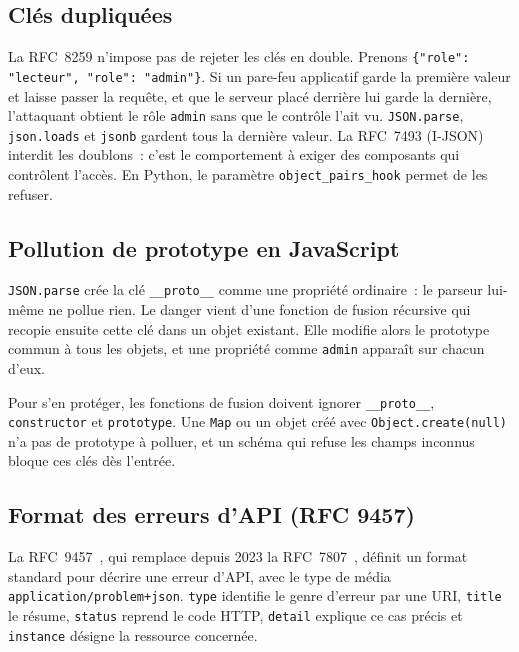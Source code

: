 \documentclass[12pt,a4paper]{article}
\newcommand{\exemple}[3][]{%
  \par\addvspace{6pt}\noindent\begin{minipage}{\linewidth}%
  \end{minipage}\par\addvspace{6pt}}
\begin{document}
\subsection{Clés dupliquées}
\label{sec:doublons}
La RFC~8259 n'impose pas de rejeter les clés en double. Prenons \texttt{\{"role": "lecteur", "role": "admin"\}}. Si un pare-feu applicatif garde la première valeur et laisse passer la requête, et que le serveur placé derrière lui garde la dernière, l'attaquant obtient le rôle \texttt{admin} sans que le contrôle l'ait vu. \texttt{JSON.parse}, \texttt{json.loads} et \texttt{jsonb} gardent tous la dernière valeur. La RFC~7493 (I-JSON)~\cite{bray2015rfc7493} interdit les doublons~: c'est le comportement à exiger des composants qui contrôlent l'accès. En Python, le paramètre \texttt{object\_pairs\_hook} permet de les refuser.

\exemple[language=python]{python/11_doublons.py}{Refuser les clés dupliquées en Python}

\subsection{Pollution de prototype en JavaScript}
\texttt{JSON.parse} crée la clé \texttt{\_\_proto\_\_} comme une propriété ordinaire~: le parseur lui-même ne pollue rien. Le danger vient d'une fonction de fusion récursive qui recopie ensuite cette clé dans un objet existant. Elle modifie alors le prototype commun à tous les objets, et une propriété comme \texttt{admin} apparaît sur chacun d'eux.

\exemple[language=javascript]{js/12_pollution.mjs}{Fusion récursive avec et sans protection}

Pour s'en protéger, les fonctions de fusion doivent ignorer \texttt{\_\_proto\_\_}, \texttt{constructor} et \texttt{prototype}. Une \texttt{Map} ou un objet créé avec \texttt{Object.create(null)} n'a pas de prototype à polluer, et un schéma qui refuse les champs inconnus bloque ces clés dès l'entrée.

\subsection{Format des erreurs d'API (RFC 9457)}
\label{sec:rfc9457}
La RFC~9457~\cite{nottingham2023rfc9457}, qui remplace depuis 2023 la RFC~7807~\cite{nottingham2016rfc7807}, définit un format standard pour décrire une erreur d'API, avec le type de média \texttt{application/problem+json}. \texttt{type} identifie le genre d'erreur par une URI, \texttt{title} le résume, \texttt{status} reprend le code HTTP, \texttt{detail} explique ce cas précis et \texttt{instance} désigne la ressource concernée.
\end{document}
